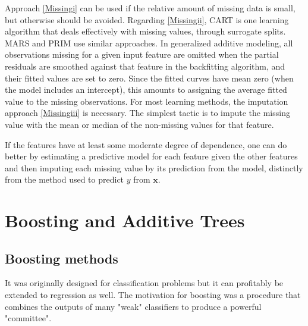 \documentclass[12pt, letterpaper]{article}
\theoremstyle{definition}
\newcommand{\x}{\mathbf{x}}
\begin{document}
Approach \ref{Missingi} can be used if the relative amount of missing data is small, but otherwise should be avoided. Regarding \ref{Missingii}, CART is one learning algorithm that deals effectively with missing values, through surrogate splits. MARS and PRIM use similar approaches. In generalized additive modeling, all observations missing for a given input feature are omitted when the partial residuals are smoothed against that feature in the backfitting algorithm, and their fitted values are set to zero. Since the fitted curves have mean zero (when the model includes an intercept), this amounts to assigning the average fitted value to the missing observations.
For most learning methods, the imputation approach \ref{Missingiii} is necessary. The simplest tactic is to impute the missing value with the mean or median of the non-missing values for that feature.

If the features have at least some moderate degree of dependence, one can do better by estimating a predictive model for each feature given the other features and then imputing each missing value by its prediction from the model, distinctly from the method used to predict $y$ from $\x$.

\section{Boosting and Additive Trees}
\subsection{Boosting methods}
 It was originally designed for classification problems but it can profitably be extended to regression as well. The motivation for boosting was a procedure that combines the outputs of many "weak" classifiers to produce a powerful "committee".
\end{document}
